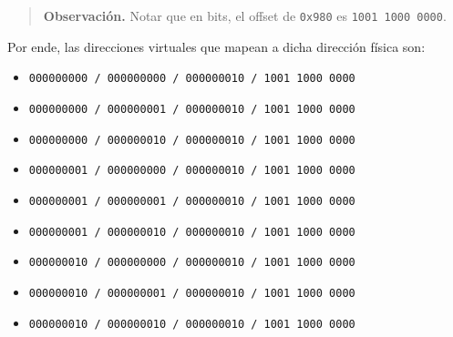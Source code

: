 \documentclass[12pt]{article}
\theoremstyle{definition}
\begin{document}
\small
\begin{quote}

\textbf{Observación.} Notar que en bits, el offset de \texttt{0x980} es
\texttt{1001 1000 0000}.

\end{quote}
\normalsize


Por ende, las direcciones virtuales que mapean a dicha dirección física son:



\begin{itemize}
    \item \texttt{000000000 / 000000000 / 000000010 / 1001 1000 0000}
    \item \texttt{000000000 / 000000001 / 000000010 / 1001 1000 0000}
    \item \texttt{000000000 / 000000010 / 000000010 / 1001 1000 0000}
    \item \texttt{000000001 / 000000000 / 000000010 / 1001 1000 0000}
    \item \texttt{000000001 / 000000001 / 000000010 / 1001 1000 0000}
    \item \texttt{000000001 / 000000010 / 000000010 / 1001 1000 0000}
    \item \texttt{000000010 / 000000000 / 000000010 / 1001 1000 0000}
    \item \texttt{000000010 / 000000001 / 000000010 / 1001 1000 0000}
    \item \texttt{000000010 / 000000010 / 000000010 / 1001 1000 0000}
\end{itemize}


\pagebreak 
\end{document}
